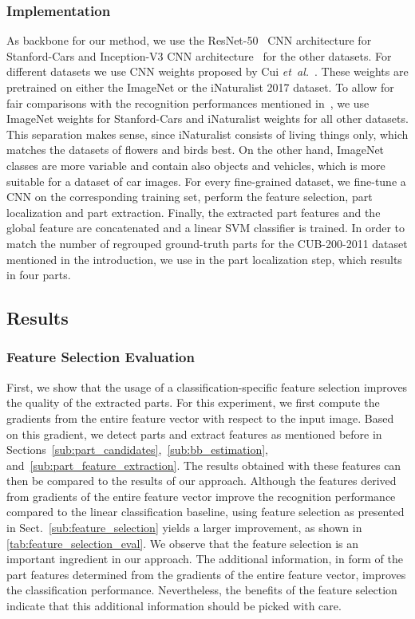 \documentclass[runningheads]{llncs}
\newcommand{\etal}{\emph{et~al.}}
\begin{document}
\subsubsection{Implementation}
\label{ssub:implementation}
As backbone for our method, we use the ResNet-50~\cite{he2016resnet} CNN architecture for Stanford-Cars and Inception-V3 CNN architecture~\cite{Szegedy_2016_CVPR} for the other datasets.
For different datasets we use CNN weights proposed by Cui \etal~\cite{Cui_2018_CVPR_large}.
These weights are pretrained on either the ImageNet or the iNaturalist 2017 dataset.
To allow for fair comparisons with the recognition performances mentioned in~\cite{Cui_2018_CVPR_large}, we use ImageNet weights for Stanford-Cars and iNaturalist weights for all other datasets.
This separation makes sense, since iNaturalist consists of living things only, which matches the datasets of flowers and birds best.
On the other hand, ImageNet classes are more variable and contain also objects and vehicles, which is more suitable for a dataset of car images.
For every fine-grained dataset, we fine-tune a CNN on the corresponding training set, perform the feature selection, part localization and part extraction.
Finally, the extracted part features and the global feature are concatenated and a linear SVM classifier is trained.
In order to match the number of regrouped ground-truth parts for the CUB-200-2011 dataset mentioned in the introduction, we use  in the part localization step, which results in four parts.

\subsection{Results}
\label{sub:results}

\subsubsection{Feature Selection Evaluation}
\label{ssub:feature_selection_eval}
First, we show that the usage of a classification-specific feature selection improves the quality of the extracted parts.
For this experiment, we first compute the gradients from the entire feature vector with respect to the input image.
Based on this gradient, we detect parts and extract features as mentioned before in Sections~\ref{sub:part_candidates},~\ref{sub:bb_estimation}, and~\ref{sub:part_feature_extraction}.
The results obtained with these features can then be compared to the results of our approach.
Although the features derived from gradients of the entire feature vector improve the recognition performance compared to the linear classification baseline, using feature selection as presented in Sect.~\ref{sub:feature_selection} yields a larger improvement, as shown in \autoref{tab:feature_selection_eval}.
We observe that the feature selection is an important ingredient in our approach.
The additional information, in form of the part features determined from the gradients of the entire feature vector, improves the classification performance.
Nevertheless, the benefits of the feature selection indicate that this additional information should be picked with care.
\end{document}
